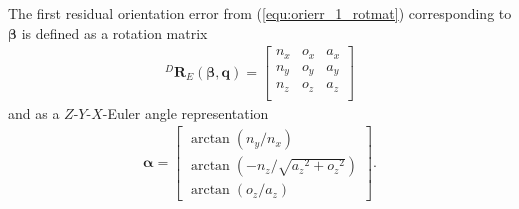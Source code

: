 \documentclass[robotics,article,submit,moreauthors,pdftex]{Definitions/mdpi}
\newcommand{\bm}[1]{\boldsymbol{#1}}
\newcommand{\rotmat}[2]{{{ }^{#1}\boldsymbol{R}}_{#2}}
\begin{document}
The first residual orientation error from (\ref{equ:orierr_1_rotmat}) corresponding to $\bm{\beta}$ is defined as a rotation matrix
%
\begin{align}
    \rotmat{D}{E}(\bm{\beta},\bm{q})
    =
    \begin{bmatrix}
        {n_x}&{o_x}&{a_x} \\
        {n_y}&{o_y}&{a_y} \\ 
        {n_z}&{o_z}&{a_z} \\ 
    \end{bmatrix}
    \label{equ:orierr_1_rotmat_def}
\end{align}
%
and as a $Z$-$Y$-$X$-Euler angle representation
%
\begin{align}
    \bm{\alpha} =
    \begin{bmatrix}
        \arctan \left( {n_y} / { n_x} \right) \\ 
        \arctan \left( -{n_z} / \sqrt {{{a_z}}^{2}+{{ o_z}}^{2}} \right) \\ 
        \arctan \left( {o_z} / {a_z} \right)
    \end{bmatrix}.
    \label{equ:alpha_xyz}
\end{align}
\end{document}
